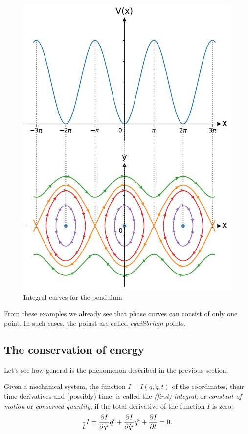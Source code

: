 \documentclass[english,fontsize=11pt,paper=a5,oneside]{scrbook}
\let\d\relax
\newcommand{\d}{\mathrm{d}}
\theoremstyle{definition}
\begin{document}
\begin{figure}[htbp]
  \centering
  \includegraphics[width=.7\linewidth]{images/potential-curves-pendulum.pdf}
  \caption{Integral curves for the pendulum}
  \label{fig:pendulum}
\end{figure}

From these examples we already see that phase curves can consist of only one point. In such cases, the poinst are called \emph{equilibrium} points.

\subsection{The conservation of energy}\label{sec:energy}

Let's see how general is the phenomenon described in the previous section.

\begin{tcolorbox}
  Given a mechanical system, the function $I = I(q, \dot q, t)$ of the coordinates, their time derivatives and (possibly) time, is called the \emph{(first) integral}, or \emph{constant of motion} or \emph{conserved quantity}, if the total derivative of the function $I$ is zero:
  \begin{equation}\label{eq:firstintegralD}
    \frac{\d}{\d t}I =
    \frac{\partial I}{\partial q^i} \dot q^i +
    \frac{\partial I}{\partial \dot q^i} \ddot q^i +
    \frac{\partial I}{\partial t}
    = 0.
  \end{equation}
\end{tcolorbox}
\end{document}
